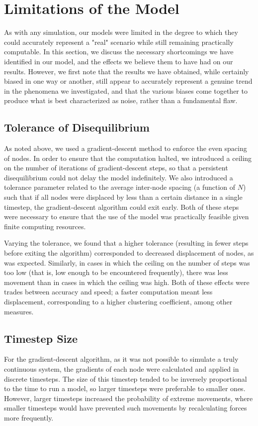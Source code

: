 \documentclass[aps,pre,reprint,superscriptaddress,amsmath,amssymb]{revtex4-1}
\begin{document}
\section{Limitations of the Model}
As with any simulation, our models were limited in the degree to which they could accurately represent a "real" scenario while still remaining practically computable.  
In this section, we discuss the necessary shortcomings we have identified in our model, and the effects we believe them to have had on our results.  
However, we first note that the results we have obtained, while certainly biased in one way or another, still appear to accurately represent a genuine trend in the phenomena we investigated, and that the various biases come together to produce what is best characterized as noise, rather than a fundamental flaw.

\subsection{Tolerance of Disequilibrium}
As noted above, we used a gradient-descent method to enforce the even spacing of nodes.  
In order to ensure that the computation halted, we introduced a ceiling on the number of iterations of gradient-descent steps, so that a persistent disequilibrium could not delay the model indefinitely.  
We also introduced a tolerance parameter related to the average inter-node spacing (a function of $N$) such that if all nodes were displaced by less than a certain distance in a single timestep, the gradient-descent algorithm could exit early.  
Both of these steps were necessary to ensure that the use of the model was practically feasible given finite computing resources.

Varying the tolerance, we found that a higher tolerance (resulting in fewer steps before exiting the algorithm) corresponded to decreased displacement of nodes, as was expected.  
Similarly, in cases in which the ceiling on the number of steps was too low (that is, low enough to be encountered frequently), there was less movement than in cases in which the ceiling was high.  
Both of these effects were trades between accuracy and speed; a faster computation meant less displacement, corresponding to a higher clustering coefficient, among other measures.

\subsection{Timestep Size}
For the gradient-descent algorithm, as it was not possible to simulate a truly continuous system, the gradients of each node were calculated and applied in discrete timesteps.  
The size of this timestep tended to be inversely proportional to the time to run a model, so larger timesteps were preferable to smaller ones.  
However, larger timesteps increased the probability of extreme movements, where smaller timesteps would have prevented such movements by recalculating forces more frequently.
\end{document}
